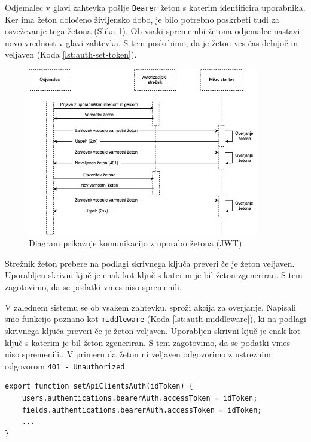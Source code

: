 \documentclass[a4paper, 12pt]{book}
\begin{document}
Odjemalec v glavi zahtevka pošlje \verb=Bearer= žeton s katerim identificira uporabnika. Ker ima žeton določeno življensko dobo, je bilo potrebno poskrbeti tudi za osveževanje tega žetona (Slika \ref{token-flow}). Ob vsaki spremembi žetona odjemalec nastavi novo vrednost v glavi zahtevka. S tem poskrbimo, da je žeton ves čas delujoč in veljaven (Koda \ref{lst:auth-set-token}).

\begin{figure}[h]
\begin{center}
\includegraphics[width=0.9\textwidth]{slike/token-flow.png}
\end{center}
\caption{ Diagram prikazuje komunikacijo z uporabo žetona (JWT) }
\label{token-flow}
\end{figure}

Strežnik žeton prebere na podlagi skrivnega ključa preveri če je žeton veljaven. Uporabljen skrivni kjuč je enak kot ključ s katerim je bil žeton zgeneriran. S tem zagotovimo, da se podatki vmes niso spremenili.

V zalednem sistemu se ob vsakem zahtevku, sproži akcija za overjanje. Napisali smo funkcijo poznano kot \verb=middleware= (Koda \ref{lst:auth-middleware}), ki na podlagi skrivnega ključa preveri če je žeton veljaven. Uporabljen skrivni kjuč je enak kot ključ s katerim je bil žeton zgeneriran. S tem zagotovimo, da se podatki vmes niso spremenili.. V primeru da žeton ni veljaven odgovorimo z ustreznim odgovorom \verb=401 - Unauthorized=. 

\begin{lstlisting}[style=mystyle,caption={Izsek kode za nastavljanje žetona posameznemu odjemalcu},label=lst:auth-set-token]
export function setApiClientsAuth(idToken) {
    users.authentications.bearerAuth.accessToken = idToken;
    fields.authentications.bearerAuth.accessToken = idToken;
    ...
}
\end{lstlisting}
\end{document}
